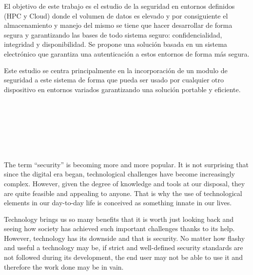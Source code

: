 El objetivo de este trabajo es el estudio de la seguridad en entornos definidos (HPC y Cloud) donde el volumen de datos es elevado y por consiguiente el almacenamiento y manejo del mismo
se tiene que hacer desarrollar de forma segura y garantizando las bases de todo sistema seguro: confidencialidad, integridad y disponibilidad. 
Se propone una solución basada en un sistema electrónico que garantiza una autenticación a estos entornos de forma más segura. 

Este estudio se centra principalmente en la incorporación de un modulo de seguridad a este sistema de forma que pueda ser usado por cualquier otro dispositivo en entornos variados 
garantizando una solución portable y eficiente.


\thispagestyle{empty}

\begin{center}
    {\large\bfseries \myTitleEN}\\
\end{center}

\begin{center}
    \myName\\
\end{center}

\\

\vspace{0.7cm}

\\


The term ``security'' is becoming more and more popular. It is not surprising that since the digital era began, technological challenges have become increasingly complex. However, given the degree of knowledge and tools at our disposal, they are quite feasible and appealing to anyone. That is why the use of technological elements in our day-to-day life is conceived as something innate in our lives. 

Technology brings us so many benefits that it is worth just looking back and seeing how society has achieved such important challenges thanks to its help. 
However, technology has its downside and that is security. No matter how flashy and useful a technology may be, if strict and well-defined security standards are not followed during its development, the end user may not be able to use it and therefore the work done may be in vain.

